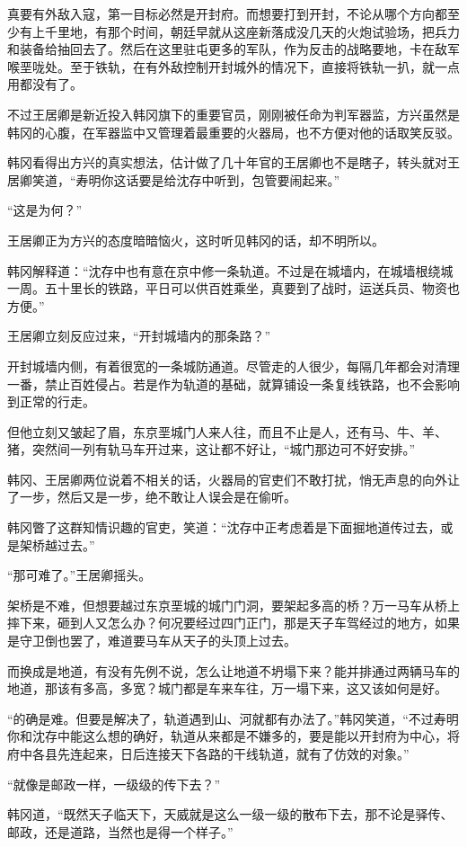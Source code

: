 真要有外敌入寇，第一目标必然是开封府。而想要打到开封，不论从哪个方向都至少有上千里地，有那个时间，朝廷早就从这座新落成没几天的火炮试验场，把兵力和装备给抽回去了。然后在这里驻屯更多的军队，作为反击的战略要地，卡在敌军喉垩咙处。至于铁轨，在有外敌控制开封城外的情况下，直接将铁轨一扒，就一点用都没有了。

不过王居卿是新近投入韩冈旗下的重要官员，刚刚被任命为判军器监，方兴虽然是韩冈的心腹，在军器监中又管理着最重要的火器局，也不方便对他的话取笑反驳。

韩冈看得出方兴的真实想法，估计做了几十年官的王居卿也不是瞎子，转头就对王居卿笑道，“寿明你这话要是给沈存中听到，包管要闹起来。”

“这是为何？”

王居卿正为方兴的态度暗暗恼火，这时听见韩冈的话，却不明所以。

韩冈解释道：“沈存中也有意在京中修一条轨道。不过是在城墙内，在城墙根绕城一周。五十里长的铁路，平日可以供百姓乘坐，真要到了战时，运送兵员、物资也方便。”

王居卿立刻反应过来，“开封城墙内的那条路？”

开封城墙内侧，有着很宽的一条城防通道。尽管走的人很少，每隔几年都会对清理一番，禁止百姓侵占。若是作为轨道的基础，就算铺设一条复线铁路，也不会影响到正常的行走。

但他立刻又皱起了眉，东京垩城门人来人往，而且不止是人，还有马、牛、羊、猪，突然间一列有轨马车开过来，这让都不好让，“城门那边可不好安排。”

韩冈、王居卿两位说着不相关的话，火器局的官吏们不敢打扰，悄无声息的向外让了一步，然后又是一步，绝不敢让人误会是在偷听。

韩冈瞥了这群知情识趣的官吏，笑道：“沈存中正考虑着是下面掘地道传过去，或是架桥越过去。”

“那可难了。”王居卿摇头。

架桥是不难，但想要越过东京垩城的城门门洞，要架起多高的桥？万一马车从桥上摔下来，砸到人又怎么办？何况要经过四门正门，那是天子车驾经过的地方，如果是守卫倒也罢了，难道要马车从天子的头顶上过去。

而换成是地道，有没有先例不说，怎么让地道不坍塌下来？能并排通过两辆马车的地道，那该有多高，多宽？城门都是车来车往，万一塌下来，这又该如何是好。

“的确是难。但要是解决了，轨道遇到山、河就都有办法了。”韩冈笑道，“不过寿明你和沈存中能这么想的确好，轨道从来都是不嫌多的，要是能以开封府为中心，将府中各县先连起来，日后连接天下各路的干线轨道，就有了仿效的对象。”

“就像是邮政一样，一级级的传下去？”

韩冈道，“既然天子临天下，天威就是这么一级一级的散布下去，那不论是驿传、邮政，还是道路，当然也是得一个样子。”

